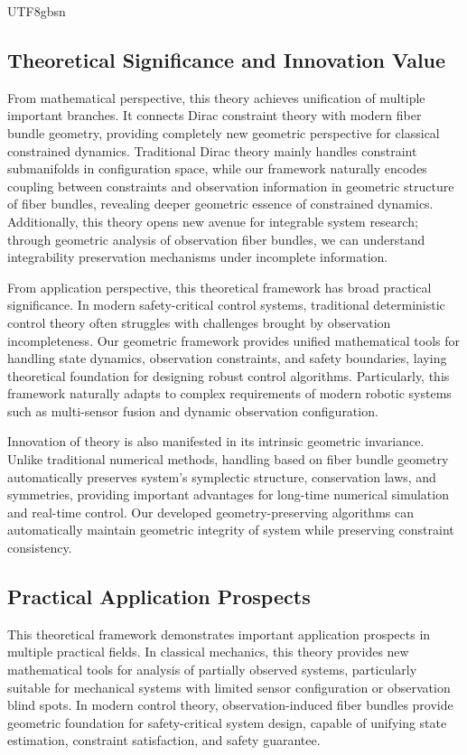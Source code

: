 \documentclass[a4paper,12pt]{extarticle}
\theoremstyle{definition}
\begin{document}
\begin{CJK}{UTF8}{gbsn}
\subsection{Theoretical Significance and Innovation Value}

From mathematical perspective, this theory achieves unification of multiple important branches. It connects Dirac constraint theory with modern fiber bundle geometry, providing completely new geometric perspective for classical constrained dynamics. Traditional Dirac theory mainly handles constraint submanifolds in configuration space, while our framework naturally encodes coupling between constraints and observation information in geometric structure of fiber bundles, revealing deeper geometric essence of constrained dynamics. Additionally, this theory opens new avenue for integrable system research; through geometric analysis of observation fiber bundles, we can understand integrability preservation mechanisms under incomplete information.

From application perspective, this theoretical framework has broad practical significance. In modern safety-critical control systems, traditional deterministic control theory often struggles with challenges brought by observation incompleteness. Our geometric framework provides unified mathematical tools for handling state dynamics, observation constraints, and safety boundaries, laying theoretical foundation for designing robust control algorithms. Particularly, this framework naturally adapts to complex requirements of modern robotic systems such as multi-sensor fusion and dynamic observation configuration.

Innovation of theory is also manifested in its intrinsic geometric invariance. Unlike traditional numerical methods, handling based on fiber bundle geometry automatically preserves system's symplectic structure, conservation laws, and symmetries, providing important advantages for long-time numerical simulation and real-time control. Our developed geometry-preserving algorithms can automatically maintain geometric integrity of system while preserving constraint consistency.

\subsection{Practical Application Prospects}

This theoretical framework demonstrates important application prospects in multiple practical fields. In classical mechanics, this theory provides new mathematical tools for analysis of partially observed systems, particularly suitable for mechanical systems with limited sensor configuration or observation blind spots. In modern control theory, observation-induced fiber bundles provide geometric foundation for safety-critical system design, capable of unifying state estimation, constraint satisfaction, and safety guarantee.


\end{CJK}
\end{document}

